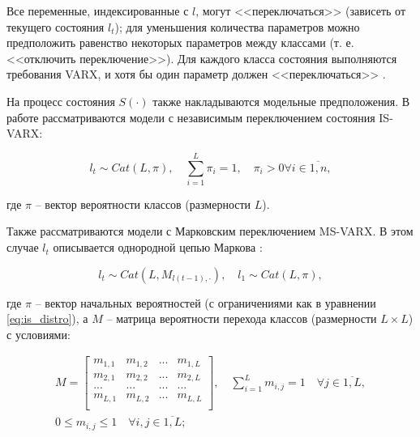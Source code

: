 \documentclass[a4paper,14pt]{extreport}
\begin{document}
Все переменные, индексированные с $l$, могут <<переключаться>> (зависеть от текущего состояния $l_t$); для уменьшения количества параметров можно предположить равенство некоторых параметров между классами (т. е. <<отключить переключение>>). Для каждого класса состояния выполняются требования VARX, и хотя бы один параметр должен <<переключаться>> \cite{malNovopMSVARX}.

На процесс состояния $S(\cdot)$ также накладываются модельные предположения. В работе рассматриваются модели с независимым переключением состояния IS-VARX:

\begin{equation}
	l_t \sim \mathit{Cat}(L, \pi), \quad \sum_{i=1}^{L}{\pi_i} = 1, \quad \pi_i > 0  \forall i \in \overline{1,n},
	\label{eq:is_distro}
\end{equation}

\noindent
где $\pi$ -- вектор вероятности классов (размерности $L$).

Также рассматриваются модели с Марковским переключением MS-VARX. 
В этом случае $l_t$ описывается однородной цепью Маркова  \cite{malNovopMSVARX}:

\begin{equation}
	l_t \sim \mathit{Cat}(L, M_{l(t-1), \cdot}),
	\quad 
	l_1 \sim \mathit{Cat}(L, \pi) ,
\end{equation}

\noindent
где $\pi$ -- вектор начальных вероятностей (с ограничениями как в уравнении \eqref{eq:is_distro}), а $M$ -- матрица вероятности перехода классов (размерности $L \times L$) с условиями:

\begin{equation}
	\begin{multlined}
		M=
		\left[
			{
					\begin{array}{cccc}
						m_{1,1} & m_{1,2} & ... & m_{1,L} \\
						m_{2,1} & m_{2,2} & ... & m_{2,L} \\
						...     & ...     & ... & ...     \\
						m_{L,1} & m_{L,2} & ... & m_{L,L} \\
					\end{array}
				}
			\right]
		, \quad
		\sum_{i=1}^{L} m_{i,j} = 1 \quad \forall j \in \overline{1,L}
		,
		\\
		0 \le m_{i,j} \le 1 \quad \forall i, j \in \overline{1,L} ;
	\end{multlined}
\end{equation}
\end{document}
